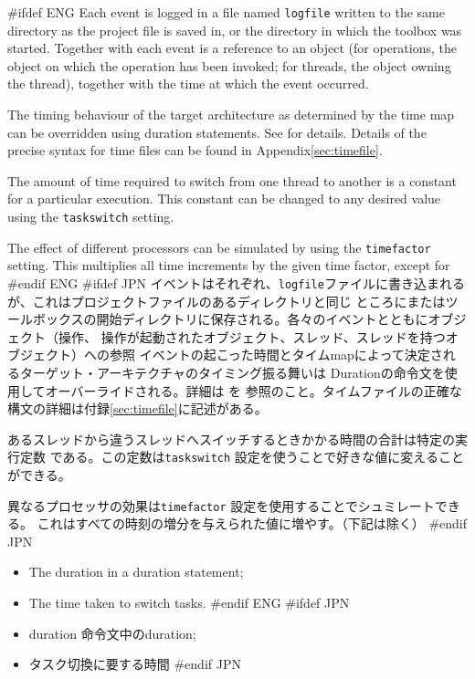 \documentclass[\pformat,12pt]{article}
\begin{document}
#ifdef ENG
Each event is logged in a file named \texttt{logfile} written to the
same directory as the project file is saved in, or the directory in
which the toolbox was started. Together with each event is a reference
to an object (for operations, the object on which the operation has
been invoked; for threads, the object owning the thread), together
with the time at which the event occurred.

The timing behaviour of the target architecture as determined by the
time map can be overridden using duration statements. See
\cite{LangManPP-CSK} for details. Details of the precise syntax for time
files can be found in Appendix\ref{sec:timefile}.

The amount of time required to switch from one thread to another is a
constant for a particular execution. This constant can be changed to
any desired value using the \texttt{taskswitch} setting.

The effect of different processors can be simulated by using the
\texttt{timefactor} setting. This multiplies all time increments by
the given time factor, except for
#endif ENG
#ifdef JPN
イベントはそれぞれ、\texttt{logfile}ファイルに書き込まれるが、これはプロジェクトファイルのあるディレクトリと同じ
ところにまたはツールボックスの開始ディレクトリに保存される。各々のイベントとともにオブジェクト（操作、
操作が起動されたオブジェクト、スレッド、スレッドを持つオブジェクト）への参照
イベントの起こった時間とタイムmapによって決定されるターゲット・アーキテクチャのタイミング振る舞いは
Durationの命令文を使用してオーバーライドされる。詳細は\cite{LangManPP-CSK} を
参照のこと。タイムファイルの正確な構文の詳細は付録\ref{sec:timefile}に記述がある。

あるスレッドから違うスレッドへスイッチするときかかる時間の合計は特定の実行定数
である。この定数は\texttt{taskswitch} 設定を使うことで好きな値に変えることができる。

異なるプロセッサの効果は\texttt{timefactor} 設定を使用することでシュミレートできる。
これはすべての時刻の増分を与えられた値に増やす。（下記は除く）
#endif JPN

\begin{itemize}
#ifdef ENG
\item The duration in a duration statement;
\item The time taken to switch tasks.
#endif ENG
#ifdef JPN
\item duration 命令文中のduration;
\item タスク切換に要する時間
#endif JPN
\end{itemize}
\end{document}
